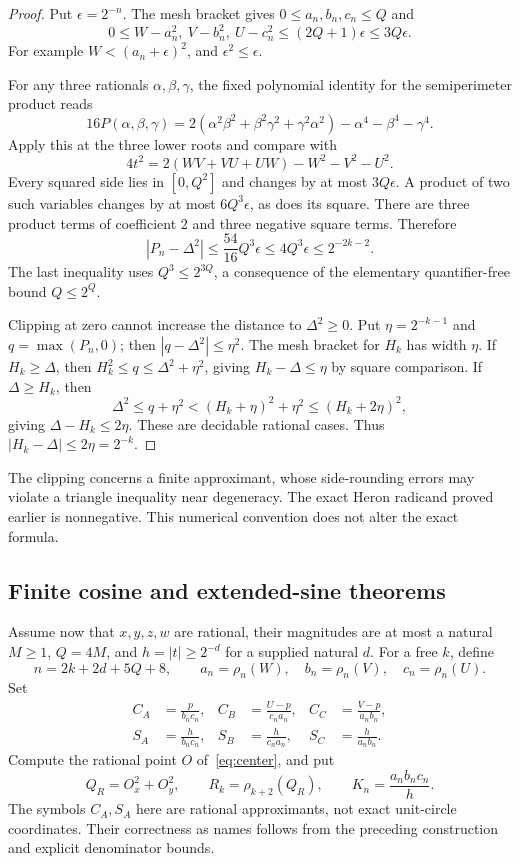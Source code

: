 \documentclass[11pt,a4paper]{article}
\theoremstyle{definition}
\newcommand{\abs}[1]{\left|#1\right|}
\newcommand{\rhoq}[2]{\rho_{#1}\!\left(#2\right)}
\numberwithin{equation}{section}
\begin{document}
\begin{proof}
Put \(\epsilon=2^{-n}\).
The mesh bracket gives \(0\le a_n,b_n,c_n\le Q\) and
\[
 0\le W-a_n^2,\ V-b_n^2,\ U-c_n^2
 \le(2Q+1)\epsilon\le3Q\epsilon.
 \tag{8.2}\label{eq:square-deficits}
\]
For example \(W<(a_n+\epsilon)^2\), and
\(\epsilon^2\le\epsilon\).

For any three rationals \(\alpha,\beta,\gamma\), the fixed
polynomial identity for the semiperimeter product reads
\[
 16P(\alpha,\beta,\gamma)
 =2(\alpha^2\beta^2+\beta^2\gamma^2+\gamma^2\alpha^2)
  -\alpha^4-\beta^4-\gamma^4.
 \]
Apply this at the three lower roots and compare with
\[
 4t^2=2(WV+VU+UW)-W^2-V^2-U^2.
 \]
Every squared side lies in \([0,Q^2]\) and changes by at most
\(3Q\epsilon\). A product of two such variables changes by
at most \(6Q^3\epsilon\), as does its square. There are three
product terms of coefficient \(2\) and three negative square
terms. Therefore
\[
 \abs{P_n-\Delta^2}
 \le\frac{54}{16}Q^3\epsilon
 \le4Q^3\epsilon
 \le2^{-2k-2}.
 \tag{8.3}\label{eq:finite-heron-square}
\]
The last inequality uses \(Q^3\le2^{3Q}\), a consequence of
the elementary quantifier-free bound \(Q\le2^Q\).

Clipping at zero cannot increase the distance to
\(\Delta^2\ge0\). Put \(\eta=2^{-k-1}\) and
\(q=\max(P_n,0)\); then \(\abs{q-\Delta^2}\le\eta^2\).
The mesh bracket for \(H_k\) has width \(\eta\).
If \(H_k\ge\Delta\), then
\(H_k^2\le q\le\Delta^2+\eta^2\), giving
\(H_k-\Delta\le\eta\) by square comparison.
If \(\Delta\ge H_k\), then
\[
 \Delta^2\le q+\eta^2
 <(H_k+\eta)^2+\eta^2
 \le(H_k+2\eta)^2,
 \]
giving \(\Delta-H_k\le2\eta\). These are decidable rational
cases. Thus \(\abs{H_k-\Delta}\le2\eta=2^{-k}\).
\end{proof}

The clipping concerns a finite approximant, whose side-rounding
errors may violate a triangle inequality near degeneracy. The exact
Heron radicand proved earlier is nonnegative. This numerical
convention does not alter the exact formula.

\subsection{Finite cosine and extended-sine theorems}

Assume now that \(x,y,z,w\) are rational, their magnitudes are at
most a natural \(M\ge1\), \(Q=4M\), and
\(h=\abs t\ge2^{-d}\) for a supplied natural \(d\).
For a free \(k\), define
\[
 n=2k+2d+5Q+8,\qquad
 a_n=\rhoq nW,\quad b_n=\rhoq nV,\quad c_n=\rhoq nU.
 \tag{8.4}\label{eq:trig-precision}
\]
Set
\begin{align*}
 C_A&=\frac p{b_nc_n},&
 C_B&=\frac{U-p}{c_na_n},&
 C_C&=\frac{V-p}{a_nb_n},\\
 S_A&=\frac h{b_nc_n},&
 S_B&=\frac h{c_na_n},&
 S_C&=\frac h{a_nb_n}.
\end{align*}
Compute the rational point \(O\) of~\eqref{eq:center}, and put
\[
 Q_R=O_x^2+O_y^2,\qquad
 R_k=\rhoq{k+2}{Q_R},\qquad K_n=\frac{a_nb_nc_n}{h}.
 \tag{8.5}
\]
The symbols \(C_A,S_A\) here are rational approximants, not exact
unit-circle coordinates. Their correctness as names follows from
the preceding construction and explicit denominator bounds.
\end{document}
